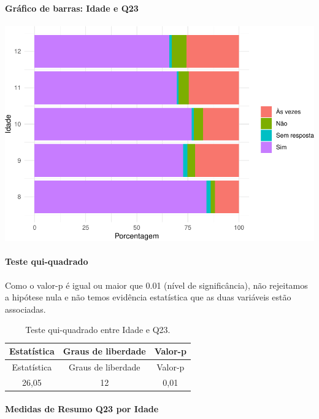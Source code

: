 \documentclass[]{article}
\let\oldparagraph\paragraph
\renewcommand{\paragraph}[1]{\oldparagraph{#1}\mbox{}}
\begin{document}
\hypertarget{gruxe1fico-de-barras-idade-e-q23}{%
\paragraph{Gráfico de barras: Idade e Q23}\label{gruxe1fico-de-barras-idade-e-q23}}

\begin{center}\includegraphics[width=0.75\linewidth]{relatorio_covid19_files/figure-latex/unnamed-chunk-564-1} \end{center}

\hypertarget{teste-qui-quadrado-49}{%
\paragraph{Teste qui-quadrado}\label{teste-qui-quadrado-49}}

Como o valor-p é igual ou maior que 0.01 (nível de significância), não rejeitamos a hipótese nula e não temos evidência estatística que as duas variáveis estão associadas.

\begin{longtable}[]{@{}ccc@{}}
\caption{\label{tab:unnamed-chunk-566}Teste qui-quadrado entre Idade e Q23.}\tabularnewline
\toprule
Estatística & Graus de liberdade & Valor-p\tabularnewline
\midrule
\endfirsthead
\toprule
Estatística & Graus de liberdade & Valor-p\tabularnewline
\midrule
\endhead
26,05 & 12 & 0,01\tabularnewline
\bottomrule
\end{longtable}

\cleardoublepage

\hypertarget{medidas-de-resumo-q23-por-idade}{%
\paragraph{Medidas de Resumo Q23 por Idade}\label{medidas-de-resumo-q23-por-idade}}
\end{document}

